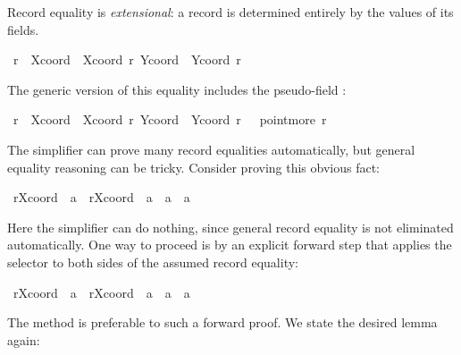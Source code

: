 \begin{isabellebody}
\begin{isamarkuptext}
  \medskip Record equality is \emph{extensional}:
   a record is determined entirely
  by the values of its fields.%
\end{isamarkuptext}%
\isamarkuptrue%
\ {\isachardoublequote}r\ {\isacharequal}\ {\isasymlparr}Xcoord\ {\isacharequal}\ Xcoord\ r{\isacharcomma}\ Ycoord\ {\isacharequal}\ Ycoord\ r{\isasymrparr}{\isachardoublequote}\isanewline
\ \ \isamarkupfalse%
\isamarkupfalse%
%
\begin{isamarkuptext}%
The generic version of this equality includes the pseudo-field
  :%
\end{isamarkuptext}%
\isamarkuptrue%
\ {\isachardoublequote}r\ {\isacharequal}\ {\isasymlparr}Xcoord\ {\isacharequal}\ Xcoord\ r{\isacharcomma}\ Ycoord\ {\isacharequal}\ Ycoord\ r{\isacharcomma}\ {\isasymdots}\ {\isacharequal}\ point{\isachardot}more\ r{\isasymrparr}{\isachardoublequote}\isanewline
\ \ \isamarkupfalse%
\isamarkupfalse%
%
\begin{isamarkuptext}%
\medskip The simplifier can prove many record equalities
  automatically, but general equality reasoning can be tricky.
  Consider proving this obvious fact:%
\end{isamarkuptext}%
\isamarkuptrue%
\ {\isachardoublequote}r{\isasymlparr}Xcoord\ {\isacharcolon}{\isacharequal}\ a{\isasymrparr}\ {\isacharequal}\ r{\isasymlparr}Xcoord\ {\isacharcolon}{\isacharequal}\ a{\isacharprime}{\isasymrparr}\ {\isasymLongrightarrow}\ a\ {\isacharequal}\ a{\isacharprime}{\isachardoublequote}\isanewline
\ \ \isamarkupfalse%
\isamarkupfalse%
\isamarkupfalse%
%
\begin{isamarkuptext}%
Here the simplifier can do nothing, since general record equality is
  not eliminated automatically.  One way to proceed is by an explicit
  forward step that applies the selector  to both sides
  of the assumed record equality:%
\end{isamarkuptext}%
\isamarkuptrue%
\ {\isachardoublequote}r{\isasymlparr}Xcoord\ {\isacharcolon}{\isacharequal}\ a{\isasymrparr}\ {\isacharequal}\ r{\isasymlparr}Xcoord\ {\isacharcolon}{\isacharequal}\ a{\isacharprime}{\isasymrparr}\ {\isasymLongrightarrow}\ a\ {\isacharequal}\ a{\isacharprime}{\isachardoublequote}\isanewline
\ \ \isamarkupfalse%
\isamarkupfalse%
\isamarkuptrue%
\isamarkupfalse%
\isamarkupfalse%
%
\begin{isamarkuptext}%
The  method is preferable to such a forward proof.  We
  state the desired lemma again:%

\end{isamarkuptext}
\end{isabellebody}
